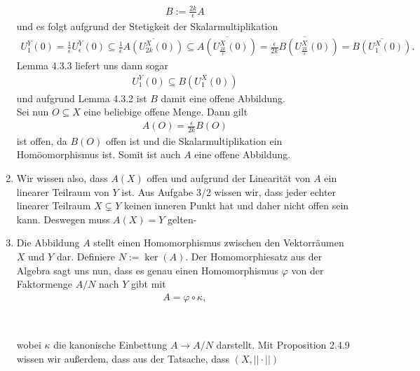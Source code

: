 \begin{solution}
\begin{enumerate}[label = (\roman*)]
\begin{align*}
    B := \frac{2k}{\epsilon}A
  \end{align*}
  und es folgt aufgrund der Stetigkeit der Skalarmultiplikation
  \begin{align*}
    U_1^Y(0) = \frac{1}{\epsilon}U_{\epsilon}^Y(0) \subseteq
    \frac{1}{\epsilon} \overline{A(U_{2k}^X(0))}
    \subseteq \overline{A(U_{\frac{2k}{\epsilon}}^X(0))}
    = \overline{\frac{\epsilon}{2k}B(U_{\frac{2k}{\epsilon}}^X(0))}
    = \overline{B(U_{1}^X(0))}.
  \end{align*}
  Lemma 4.3.3 liefert uns dann sogar
  \begin{align*}
    U_1^Y(0) \subseteq B(U_{1}^X(0))
  \end{align*}
  und aufgrund Lemma 4.3.2 ist $B$ damit eine offene Abbildung. \\
  Sei nun $O \subseteq X$ eine beliebige offene Menge. Dann gilt
  \begin{align*}
    A(O) = \frac{\epsilon}{2k}B(O)
  \end{align*}
  ist offen, da $B(O)$ offen ist und die Skalarmultiplikation ein Homöomorphismus ist.
  Somit ist auch $A$ eine offene Abbildung.
  \item Wir wissen also, dass $A(X)$ offen und aufgrund der Linearität von $A$
  ein linearer Teilraum von $Y$ ist. Aus Aufgabe 3/2 wissen wir, dass
  jeder echter linearer Teilraum $X \subsetneq Y$ keinen inneren Punkt hat und
  daher nicht offen sein kann. Deswegen muss $A(X) = Y$ gelten-
  \item Die Abbildung $A$ stellt einen Homomorphismus zwischen den Vektorräumen
  $X$ und $Y$ dar. Definiere $N := \ker(A)$. Der Homomorphiesatz aus der Algebra
  sagt uns nun, dass es genau einen Homomorphismus $\varphi$ von der Faktormenge $A/N$
  nach $Y$ gibt mit
  \begin{align*}
    A = \varphi \circ \kappa,
  \end{align*}
  \begin{center}
   \\
  \end{center}
  wobei $\kappa$ die kanonische Einbettung $A \rightarrow A/N$ darstellt.
  Mit Proposition 2.4.9 wissen wir außerdem, dass aus der Tatsache, dass $(X,||\cdot||)$

\end{enumerate}
\end{solution}
